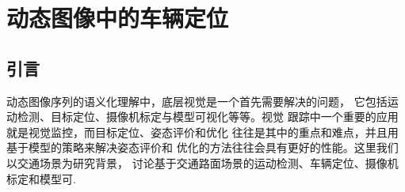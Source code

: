 \chapter{动态图像中的车辆定位}
\label{chap4}

\section{引言}

动态图像序列的语义化理解中，底层视觉是一个首先需要解决的问题，
它包括运动检测、目标定位、摄像机标定与模型可视化等等。视觉
跟踪中一个重要的应用就是视觉监控，而目标定位、姿态评价和优化
往往是其中的重点和难点，并且用基于模型的策略来解决姿态评价和
优化的方法往往会具有更好的性能。这里我们以交通场景为研究背景，
讨论基于交通路面场景的运动检测、车辆定位、摄像机标定和模型可.
